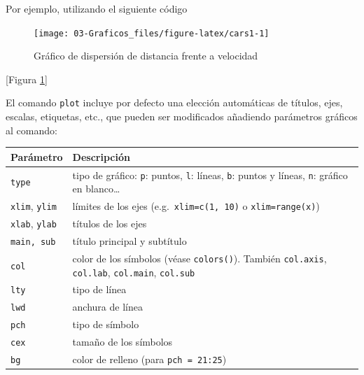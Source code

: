 \documentclass[
]{book}
\newenvironment{Shaded}{\begin{snugshade}}{\end{snugshade}}
\newcommand{\CommentTok}[1]{\textcolor[rgb]{0.56,0.35,0.01}{\textit{#1}}}
\newcommand{\FunctionTok}[1]{\textcolor[rgb]{0.00,0.00,0.00}{#1}}
\newcommand{\NormalTok}[1]{#1}
\newcommand{\SpecialCharTok}[1]{\textcolor[rgb]{0.00,0.00,0.00}{#1}}
\theoremstyle{break}
\theoremstyle{nonumberplain}
\begin{document}
Por ejemplo, utilizando el siguiente código

\begin{Shaded}
\end{Shaded}

\begin{figure}[!htb]

{\centering \texttt{[image: 03-Graficos\_files/figure-latex/cars1-1]} 

}

\caption{Gráfico de dispersión de distancia frente a velocidad}\label{fig:cars1}
\end{figure}

{[}Figura \ref{fig:cars1}{]}

El comando \texttt{plot} incluye por defecto una elección automáticas de
títulos, ejes, escalas, etiquetas, etc., que pueden ser modificados
añadiendo parámetros gráficos al comando:

\begin{longtable}[]{@{}
  >{\raggedright\arraybackslash}p{}
  >{\raggedright\arraybackslash}p{}@{}}
\toprule
Parámetro & Descripción \\
\midrule
\endhead
\texttt{type} & tipo de gráfico:
\texttt{p}: puntos, \texttt{l}: líneas, \texttt{b}: puntos y líneas,
\texttt{n}: gráfico en blanco\ldots{} \\
\texttt{xlim}, \texttt{ylim} & límites de los ejes
(e.g.~\texttt{xlim=c(1,\ 10)} o \texttt{xlim=range(x)}) \\
\texttt{xlab}, \texttt{ylab} & títulos de los ejes \\
\texttt{main,\ sub} & título principal y subtítulo \\
\texttt{col} & color de los símbolos (véase \texttt{colors()}).
También \texttt{col.axis}, \texttt{col.lab}, \texttt{col.main}, \texttt{col.sub} \\
\texttt{lty} & tipo de línea \\
\texttt{lwd} & anchura de línea \\
\texttt{pch} & tipo de símbolo \\
\texttt{cex} & tamaño de los símbolos \\
\texttt{bg} & color de relleno (para \texttt{pch\ =\ 21:25}) \\
\bottomrule
\end{longtable}
\end{document}
